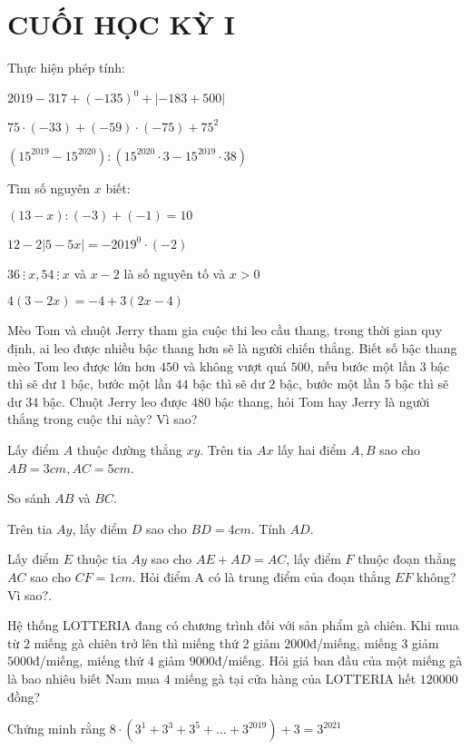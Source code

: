 \section{CUỐI HỌC KỲ I}
\setcounter{ex}{0}
\begin{ex}
	Thực hiện phép tính:
	\begin{listEX}
	\item $2019-317+(-135)^0+\left|-183+500\right|$
	\item $75\cdot(-33)+(-59)\cdot(-75)+75^2$  
	\item $(15^{2019}-15^{2020}):(15^{2020}\cdot3-15^{2019}\cdot38)$ 
	\end{listEX}
\end{ex}
\begin{ex}
	Tìm số nguyên $x$ biết:
	\begin{listEX}[2]
	\item $(13-x):(-3)+(-1)=10$
	\item $12-2|5-5x|=-2019^0\cdot(-2)$ 
	\item $36~ \vdots~ x, 54 ~\vdots~ x$ và $x-2$ là số nguyên tố và $x>0$
	\item $4(3-2x)=-4+3(2x-4)$ 
	\end{listEX}
\end{ex}
\begin{ex}
	Mèo Tom và chuột Jerry tham gia cuộc thi leo cầu thang, trong thời gian quy định, ai leo được nhiều bậc thang hơn sẽ là người chiến thắng. Biết số bậc thang mèo Tom leo được lớn hơn $450$ và không vượt quá $500$, nếu bước một lần $3$ bậc thì sẽ dư $1$ bậc, bước một lần $44$ bậc thì sẽ dư $2$ bậc, bước một lần $5$ bậc thì sẽ dư $34$ bậc. Chuột Jerry leo được $480$ bậc thang, hỏi Tom hay Jerry là người thắng trong cuộc thi này? Vì sao?
\end{ex}
\begin{ex}
	Lấy điểm $A$ thuộc đường thẳng $xy$. Trên tia $Ax$ lấy hai điểm $A, B$ sao cho $AB=3cm, AC=5cm$.
		\begin{listEX}
			\item So sánh $AB$ và $BC$.
	\item Trên tia $Ay$, lấy điểm $D$ sao cho $BD = 4cm$. Tính $AD$.
	\item Lấy điểm $E$ thuộc tia $Ay$ sao cho $AE+AD=AC$, lấy điểm $F$ thuộc đoạn thẳng $AC$ sao cho $CF=1cm$. Hỏi điểm A có là trung điểm của đoạn thẳng $EF$ không? Vì sao?.
		\end{listEX}
\end{ex}
\begin{ex}
	Hệ thống LOTTERIA đang có chương trình đối với sản phẩm gà chiên. Khi mua từ $2$ miếng gà chiên trở lên thì miếng thứ $2$ giảm $2000$đ/miếng, miếng $3$ giảm $5000$đ/miếng, miếng thứ $4$ giảm $9000$đ/miếng. Hỏi giá ban đầu của một miếng gà là bao nhiêu biết Nam mua $4$ miếng gà tại cửa hàng của LOTTERIA hết $120 000$ đồng?
\end{ex}
\begin{ex}
	Chứng minh rằng  $8 \cdot\left(3^{1}+3^{3}+3^{5}+\ldots+3^{2019}\right)+3=3^{2021}$
\end{ex}